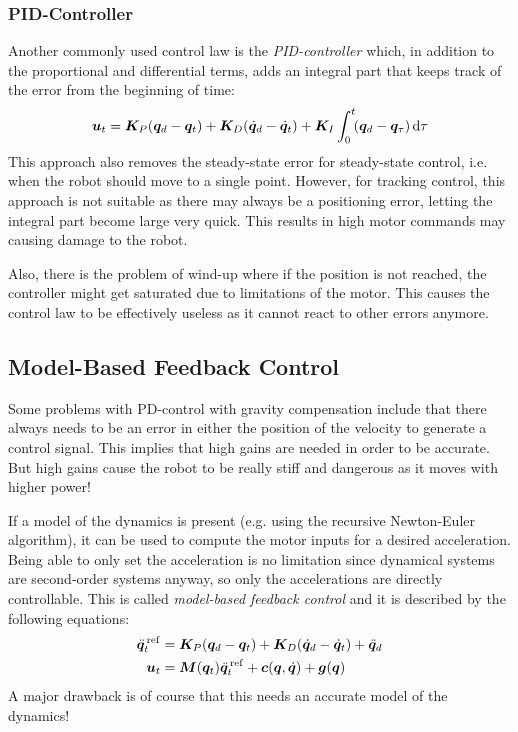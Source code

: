 			\subsubsection{PID-Controller}
				Another commonly used control law is the \emph{PID-controller} which, in addition to the proportional and differential terms, adds an integral part that keeps track of the error from the beginning of time:
				\begin{equation*}
					\bm{u}_t = \bm{K}_P (\bm{q}_d - \bm{q}_t) + \bm{K}_D (\dot{\bm{q}}_d - \dot{\bm{q}}_t) + \bm{K}_I \int_0^t \! (\bm{q}_d - \bm{q}_\tau) \dd{\tau}
				\end{equation*}
				This approach also removes the steady-state error for steady-state control, i.e. when the robot should move to a single point. However, for tracking control, this approach is not suitable as there may always be a positioning error, letting the integral part become large very quick. This results in high motor commands may causing damage to the robot.

				Also, there is the problem of wind-up where if the position is not reached, the controller might get saturated due to limitations of the motor. This causes the control law to be effectively useless as it cannot react to other errors anymore.

		\subsection{Model-Based Feedback Control}
			Some problems with PD-control with gravity compensation include that there always needs to be an error in either the position of the velocity to generate a control signal. This implies that high gains are needed in order to be accurate. But high gains cause the robot to be really stiff and dangerous as it moves with higher power!

			If a model of the dynamics is present (e.g. using the recursive Newton-Euler algorithm), it can be used to compute the motor inputs for a desired acceleration. Being able to only set the acceleration is no limitation since dynamical systems are second-order systems anyway, so only the accelerations are directly controllable. This is called \emph{model-based feedback control} and it is described by the following equations:
			\begin{align*}
				\ddot{\bm{q}}_t^{\,\mathrm{ref}} &= \bm{K}_P (\bm{q}_d - \bm{q}_t) + \bm{K}_D (\dot{\bm{q}}_d - \dot{\bm{q}}_t) + \ddot{\bm{q}}_d \\
				\bm{u}_t &= \bm{M}(\bm{q}_t) \ddot{\bm{q}}_t^{\,\mathrm{ref}} + \bm{c}(\bm{q}, \dot{\bm{q}}) + \bm{g}(\bm{q})
			\end{align*}
			A major drawback is of course that this needs an accurate model of the dynamics!

